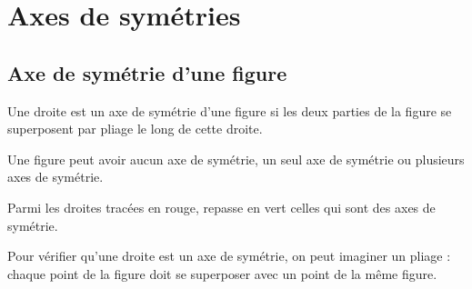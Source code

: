 \documentclass[a4paper,10pt]{report}
\begin{document}
\setcounter{chapter}{13}
\chapter{Axes de symétries}

\section{Axe de symétrie d'une figure}

\begin{defn}
Une droite est un axe de symétrie d'une figure si les deux parties de la figure se superposent par pliage le long de cette droite.
\end{defn}

\begin{rem}
Une figure peut avoir aucun axe de symétrie, un seul axe de symétrie ou plusieurs axes de symétrie.
\end{rem}

\begin{ex}
Parmi les droites tracées en rouge, repasse en vert celles qui sont des axes de symétrie.

\smallskip
\noindent\begin{minipage}{0.58\linewidth}
\grandscarreaux{\linewidth}{2.35cm}
\end{minipage}
\hfill
\begin{minipage}{0.36\linewidth}
\begin{center}
\end{center}
\end{minipage}
\end{ex}

\begin{prop}
Pour vérifier qu'une droite est un axe de symétrie, on peut imaginer un pliage : chaque point de la figure doit se superposer avec un point de la même figure.
\end{prop}
\end{document}
